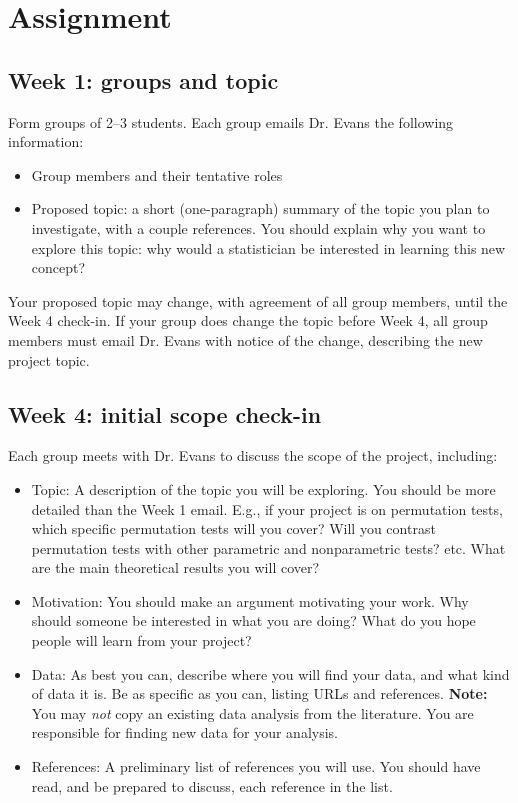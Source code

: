 \documentclass[11pt]{article}
\begin{document}
\newpage

\section*{Assignment}

\subsection*{Week 1: groups and topic}

Form groups of 2--3 students. Each group emails Dr. Evans the following information:

\begin{itemize}
\item Group members and their tentative roles
\item Proposed topic: a short (one-paragraph) summary of the topic you plan to investigate, with a couple references. You should explain why you want to explore this topic: why would a statistician be interested in learning this new concept?
\end{itemize}

\noindent Your proposed topic may change, with agreement of all group members, until the Week 4 check-in. If your group does change the topic before Week 4, all group members must email Dr. Evans with notice of the change, describing the new project topic.

\vspace{0.5cm}

\subsection*{Week 4: initial scope check-in}

Each group meets with Dr. Evans to discuss the scope of the project, including:

\begin{itemize}
\item Topic: A description of the topic you will be exploring. You should be more detailed than the Week 1 email. E.g., if your project is on permutation tests, which specific permutation tests will you cover? Will you contrast permutation tests with other parametric and nonparametric tests? etc. What are the main theoretical results you will cover?

\item Motivation: You should make an argument motivating your work. Why should someone be interested in what you are doing? What do you hope people will learn from your project?

\item Data: As best you can, describe where you will find your data, and what kind of data it is. Be as specific as you can, listing URLs and references. \textbf{Note:} You may \textit{not} copy an existing data analysis from the literature. You are responsible for finding new data for your analysis.

\item References: A preliminary list of references you will use. You should have read, and be prepared to discuss, each reference in the list.
\end{itemize}
\end{document}
